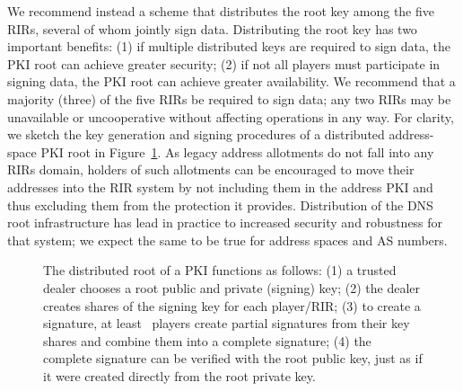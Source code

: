 We recommend instead a scheme that distributes the root key among the five RIRs, several of whom jointly sign data. Distributing the root key has two important benefits: (1) if multiple distributed keys are required to sign data, the PKI root can achieve greater security; (2) if not all players must participate in signing data, the PKI root can achieve greater availability.
We recommend that a majority (three) of the five RIRs be required to sign data; any two RIRs may be unavailable or uncooperative without affecting operations in any way. For clarity, we sketch the key generation and signing procedures of a distributed address-space PKI root in Figure~\ref{fig:sign-combine}. As legacy address allotments do not fall into any RIRs domain, holders of such allotments can be encouraged to move their addresses into the RIR system by not including them in the address PKI and thus excluding them from the protection it provides. Distribution of the DNS root infrastructure has lead in practice to increased security and robustness for that system; we expect the same to be true for address spaces and AS numbers.

\begin{figure}
\begin{center}
\end{center}
\caption{\small The distributed root of a PKI functions as follows: (1) a trusted dealer chooses a root public and private (signing) key; (2) the dealer creates shares of the signing key for each player/RIR; (3) to create a signature, at least \nums\ players create partial signatures from their key shares and combine them into a complete signature; (4) the complete signature can be verified with the root public key, just as if it were created directly from the root private key.}
\label{fig:sign-combine}
\end{figure}

